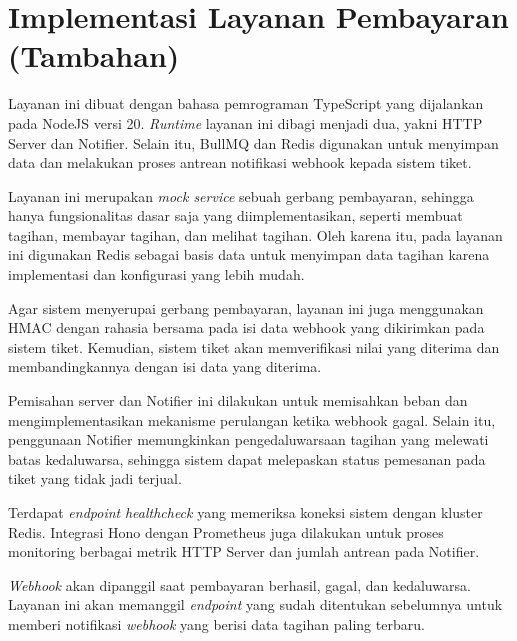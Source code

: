 \chapter{Implementasi Layanan Pembayaran (Tambahan)}
\label{apx:payment-implementation}

Layanan ini dibuat dengan bahasa pemrograman TypeScript yang dijalankan pada NodeJS versi 20. \textit{Runtime} layanan ini dibagi menjadi dua, yakni HTTP Server dan Notifier. Selain itu, BullMQ dan Redis digunakan untuk menyimpan data dan melakukan proses antrean notifikasi webhook kepada sistem tiket.

Layanan ini merupakan \textit{mock service} sebuah gerbang pembayaran, sehingga hanya fungsionalitas dasar saja yang diimplementasikan, seperti membuat tagihan, membayar tagihan, dan melihat tagihan. Oleh karena itu, pada layanan ini digunakan Redis sebagai basis data untuk menyimpan data tagihan karena implementasi dan konfigurasi yang lebih mudah.

Agar sistem menyerupai gerbang pembayaran, layanan ini juga menggunakan HMAC dengan rahasia bersama pada isi data webhook yang dikirimkan pada sistem tiket. Kemudian, sistem tiket akan memverifikasi nilai yang diterima dan membandingkannya dengan isi data yang diterima.

Pemisahan server dan Notifier ini dilakukan untuk memisahkan beban dan mengimplementasikan mekanisme perulangan ketika webhook gagal. Selain itu, penggunaan Notifier memungkinkan pengedaluwarsaan tagihan yang melewati batas kedaluwarsa, sehingga sistem dapat melepaskan status pemesanan pada tiket yang tidak jadi terjual.

Terdapat \textit{endpoint} \textit{healthcheck} yang memeriksa koneksi sistem dengan kluster Redis. Integrasi Hono dengan Prometheus juga dilakukan untuk proses monitoring berbagai metrik HTTP Server dan jumlah antrean pada Notifier.

\textit{Webhook} akan dipanggil saat pembayaran berhasil, gagal, dan kedaluwarsa. Layanan ini akan memanggil \textit{endpoint} yang sudah ditentukan sebelumnya untuk memberi notifikasi \textit{webhook} yang berisi data tagihan paling terbaru.